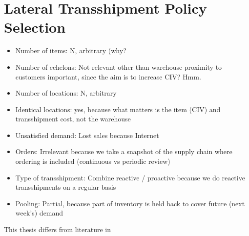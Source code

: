 \documentclass[../../main.tex]{subfiles}
\begin{document}

\section{Lateral Transshipment Policy Selection}

\begin{itemize}
\item Number of items: N, arbitrary (why?
\item Number of echelons: Not relevant other than warehouse proximity to customers important, since the aim is to increase CIV? Hmm.
\item Number of locations: N, arbitrary
\item Identical locations: yes, because what matters is the item (CIV) and transshipment cost, not the warehouse
\item Unsatisfied demand: Lost sales because Internet
\item Orders: Irrelevant because we take a snapshot of the supply chain where ordering is included (continuous vs periodic review)
\item Type of transshipment: Combine reactive / proactive because we do reactive transshipments on a regular basis
\item Pooling: Partial, because part of inventory is held back to cover future (next week's) demand
\end{itemize}

This thesis differs from literature in 


\end{document}
